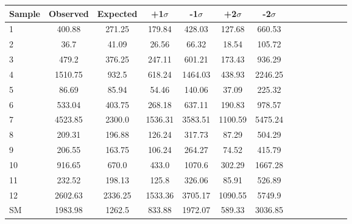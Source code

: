 \begin{table}[h]
\begin{center}
\begin{tabular}{|l|c|c|c|c|c|c|c|c|c|c|c|c|c|}
\hline
Sample & Observed & Expected & +1$\sigma$ & -1$\sigma$ & +2$\sigma$ & -2$\sigma$ \\ \hline
1 & 400.88 & 271.25 & 179.84 & 428.03 & 127.68 & 660.53\\
2 & 36.7 & 41.09 & 26.56 & 66.32 & 18.54 & 105.72\\
3 & 479.2 & 376.25 & 247.11 & 601.21 & 173.43 & 936.29\\
4 & 1510.75 & 932.5 & 618.24 & 1464.03 & 438.93 & 2246.25\\
5 & 86.69 & 85.94 & 54.46 & 140.06 & 37.09 & 225.32\\
6 & 533.04 & 403.75 & 268.18 & 637.11 & 190.83 & 978.57\\
7 & 4523.85 & 2300.0 & 1536.31 & 3583.51 & 1100.59 & 5475.24\\
8 & 209.31 & 196.88 & 126.24 & 317.73 & 87.29 & 504.29\\
9 & 206.55 & 163.75 & 106.24 & 264.27 & 74.52 & 415.79\\
10 & 916.65 & 670.0 & 433.0 & 1070.6 & 302.29 & 1667.28\\
11 & 232.52 & 198.13 & 125.8 & 326.06 & 85.91 & 526.89\\
12 & 2602.63 & 2336.25 & 1533.36 & 3705.17 & 1090.55 & 5749.9\\
SM & 1983.98 & 1262.5 & 833.88 & 1972.07 & 589.33 & 3036.85\\

\end{tabular}
\end{center}
\end{table}
